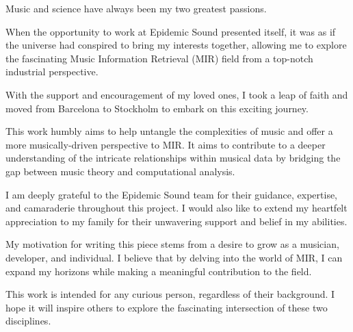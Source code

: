 \begin{preface}

Music and science have always been my two greatest passions. 

When the opportunity to work at Epidemic Sound presented itself, it was as if the universe had conspired to bring my interests together, allowing me to explore the fascinating Music Information Retrieval (MIR) field from a top-notch industrial perspective. 

With the support and encouragement of my loved ones, I took a leap of faith and moved from Barcelona to Stockholm to embark on this exciting journey.

This work humbly aims to help untangle the complexities of music and offer a more musically-driven perspective to MIR. It aims to contribute to a deeper understanding of the intricate relationships within musical data by bridging the gap between music theory and computational analysis.

I am deeply grateful to the Epidemic Sound team for their guidance, expertise, and camaraderie throughout this project. I would also like to extend my heartfelt appreciation to my family for their unwavering support and belief in my abilities.

My motivation for writing this piece stems from a desire to grow as a musician, developer, and individual. I believe that by delving into the world of MIR, I can expand my horizons while making a meaningful contribution to the field.

This work is intended for any curious person, regardless of their background. I hope it will inspire others to explore the fascinating intersection of these two disciplines.

\newpage
\end{preface}